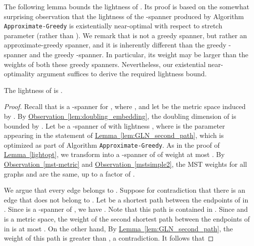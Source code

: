 \documentclass[11pt,letterpaper]{article}
\newcommand{\namedref}[2]{\hyperref[#2]{#1~\ref*{#2}}}
\newcommand{\lemmaref}[1]{\namedref{Lemma}{#1}}
\newcommand{\observationref}[1]{\namedref{Observation}{#1}}
\begin{document}
The following lemma bounds the lightness of .
Its proof is based on the somewhat surprising observation that the lightness of the -spanner  produced by Algorithm \texttt{Approximate-Greedy} is existentially near-optimal with respect to stretch parameter  (rather than ).
We remark that  is not a greedy spanner, but rather an approximate-greedy spanner,
and it is inherently different than the greedy -spanner and the greedy -spanner.
In particular, its weight may be larger than the weights of both these greedy spanners.
Nevertheless, our existential near-optimality argument suffices to derive the required lightness bound.
\begin{lemma}
	The lightness of  is .
\end{lemma}

\begin{proof}					
	Recall that  is a -spanner for , where ,  and let  be the metric space induced by .
	By \observationref{lem:doubling_embedding}, the doubling dimension of  is bounded by .
	Let  be a -spanner of  with lightness , where 
	is the parameter appearing in the statement of \lemmaref{lem:GLN_second_path}, which is optimized as part of Algorithm  \texttt{Approximate-Greedy}.
	As in the proof of \lemmaref{lightopt}, we transform  into a -spanner  of  of weight at most .
	By \observationref{mst-metric} and \observationref{mstsimple2}, the MST weights for all graphs  and  are the same, up to a factor of .
	
	
	We argue that every edge  belongs to .
	Suppose for contradiction that there is an edge  that does not belong to .
	Let  be a shortest path between the endpoints of  in . Since  is a -spanner of , we have .
	Note that this path is contained in . Since  and  is a metric space, the weight of the second shortest path between the endpoints of  in  is at most
	.
	On the other hand, By \lemmaref{lem:GLN_second_path}, the weight of this path is greater than , a contradiction.
	It follows that
	
\end{proof}
\end{document}
